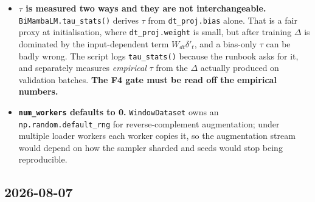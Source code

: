 \documentclass[11pt,a4paper]{article}
\newcommand{\code}[1]{\texttt{\small #1}}
\newcommand{\warn}[1]{\textcolor{warncol}{\textbf{#1}}}
\begin{document}
\begin{itemize}
bits/nucleotide by an amount that varies with each window's N content. The
reported metric is therefore bits per \emph{resolved} nucleotide, and its
uniform-random floor is exactly 2.000 bits.
\item \warn{$\tau$ is measured two ways and they are not interchangeable.}
\code{BiMambaLM.tau\_stats()} derives $\tau$ from \code{dt\_proj.bias} alone.
That is a fair proxy at initialisation, where \code{dt\_proj.weight} is small,
but after training $\Delta$ is dominated by the input-dependent term
$W_{dt}\delta'_t$, and a bias-only $\tau$ can be badly wrong. The script logs
\code{tau\_stats()} because the runbook asks for it, and separately measures
\emph{empirical} $\tau$ from the $\Delta$ actually produced on validation
batches. \textbf{The F4 gate must be read off the empirical numbers.}
\item \textbf{\code{num\_workers} defaults to 0.} \code{WindowDataset} owns an
\code{np.random.default\_rng} for reverse-complement augmentation; under
multiple loader workers each worker copies it, so the augmentation stream would
depend on how the sampler sharded and seeds would stop being reproducible.
\end{itemize}

\subsection*{2026-08-07}
\end{document}
